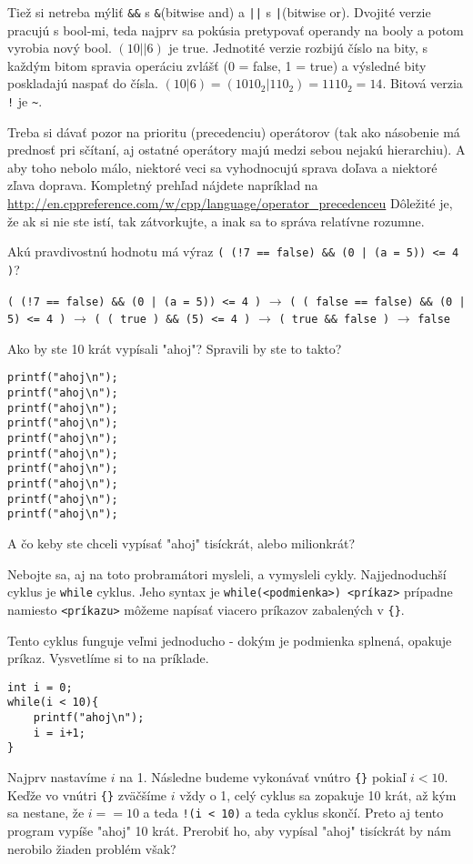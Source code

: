 Tiež si netreba mýliť \verb!&&! s \verb!&!(bitwise and) a \verb!||! s
\verb!|!(bitwise or). Dvojité verzie pracujú s bool-mi, teda najprv sa pokúsia
pretypovať operandy na booly a potom vyrobia nový bool. $(10 || 6)$ je true.
Jednotité verzie rozbijú číslo na bity, s každým bitom spravia operáciu zvlášť
(0 = false, 1 = true) a výsledné bity poskladajú naspať do čísla. $(10 | 6) =
(1010_2 | 110_2) = 1110_2 = 14$.  Bitová verzia \verb'!' je \verb'~'.

Treba si dávať pozor na prioritu (precedenciu) operátorov (tak ako násobenie má
prednosť pri sčítaní, aj ostatné operátory majú medzi sebou nejakú hierarchiu).
A aby toho nebolo málo, niektoré veci sa vyhodnocujú sprava doľava a niektoré
zľava doprava. Kompletný prehľad nájdete napríklad na
\url{http://en.cppreference.com/w/cpp/language/operator\_precedenceu} Dôležité
je, že ak si nie ste istí, tak zátvorkujte, a inak sa to správa relatívne
rozumne.

 Akú pravdivostnú hodnotu má výraz 
\verb'( (!7 == false) && (0 | (a = 5)) <= 4 )'?

 \verb'( (!7 == false) && (0 | (a = 5)) <= 4 )' $\rightarrow$
\verb'( ( false == false) && (0 | 5) <= 4 )' $\rightarrow$
\verb'( ( true ) && (5) <= 4 )' $\rightarrow$ \verb'( true && false )' $\rightarrow$ \verb'false'


Ako by ste 10 krát vypísali "ahoj"? Spravili by ste to takto?
\begin{lstlisting}
printf("ahoj\n");
printf("ahoj\n");
printf("ahoj\n");
printf("ahoj\n");
printf("ahoj\n");
printf("ahoj\n");
printf("ahoj\n");
printf("ahoj\n");
printf("ahoj\n");
printf("ahoj\n");
\end{lstlisting}
A čo keby ste chceli vypísať "ahoj" tisíckrát, alebo milionkrát?

Nebojte sa, aj na toto probramátori mysleli, a vymysleli cykly.  Najjednoduchší
cyklus je \verb!while! cyklus. Jeho syntax je 
\verb!while(<podmienka>) <príkaz>! prípadne namiesto \verb!<príkazu>! 
môžeme napísať viacero príkazov zabalených v \verb!{}!.

Tento cyklus funguje veľmi jednoducho - dokým je podmienka splnená, opakuje
príkaz. Vysvetlíme si to na príklade.
\begin{lstlisting}
int i = 0;
while(i < 10){
    printf("ahoj\n");
    i = i+1;
}
\end{lstlisting}
Najprv nastavíme $i$ na 1. Následne budeme vykonávať vnútro \verb!{}! pokiaľ $i
< 10$. Keďže vo vnútri \verb!{}! zväčšíme $i$ vždy o 1, celý cyklus sa zopakuje
10 krát, až kým sa nestane, že $i == 10$ a teda \verb'!(i < 10)' a teda cyklus
skončí.  Preto aj tento program vypíše "ahoj" 10 krát. Prerobiť ho, aby vypísal
"ahoj" tisíckrát by nám nerobilo žiaden problém však?

